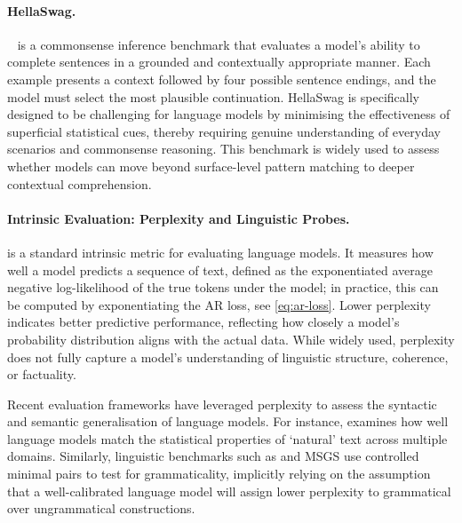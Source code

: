 
\paragraph{HellaSwag.} ~\citep{zellers2019hellaswag} is a commonsense inference benchmark that evaluates a model's ability to complete sentences in a grounded and contextually appropriate manner. Each example presents a context followed by four possible sentence endings, and the model must select the most plausible continuation. HellaSwag is specifically designed to be challenging for language models by minimising the effectiveness of superficial statistical cues, thereby requiring genuine understanding of everyday scenarios and commonsense reasoning. This benchmark is widely used to assess whether models can move beyond surface-level pattern matching to deeper contextual comprehension.

\paragraph{Intrinsic Evaluation: Perplexity and Linguistic Probes.} 
 \citep{jelinek1977perplexity} is a standard intrinsic metric for evaluating language models. It measures how well a model predicts a sequence of text, defined as the exponentiated average negative log-likelihood of the true tokens under the model; in practice, this can be computed by exponentiating the AR loss, see \cref{eq:ar-loss}. Lower perplexity indicates better predictive performance, reflecting how closely a model's probability distribution aligns with the actual data. While widely used, perplexity does not fully capture a model's understanding of linguistic structure, coherence, or factuality.

Recent evaluation frameworks have leveraged perplexity to assess the syntactic and semantic generalisation of language models. For instance,  \citep{magnusson2024paloma} examines how well language models match the statistical properties of `natural' text across multiple domains. Similarly, linguistic benchmarks such as  and MSGS \citep{warstadt2020blimp, warstadt2020msgs} use controlled minimal pairs to test for grammaticality, implicitly relying on the assumption that a well-calibrated language model will assign lower perplexity to grammatical over ungrammatical constructions.

